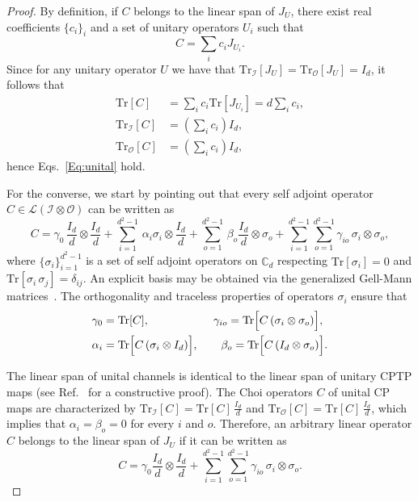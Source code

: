 \documentclass[a4paper,twocolumn,accepted=2022-10-23]{quantumarticle}
\newcommand{\Tr}[0]{{\mathrm{Tr}}}
\theoremstyle{definition}
\begin{document}
\begin{proof}
	By definition, if $C$ belongs to the linear span of $J_U$, there exist real coefficients $\{c_i\}_i$ and a set of unitary operators $U_i$ such that
\begin{equation}
	C=\sum_i c_i J_{U_i}.
\end{equation}
	Since for any unitary operator $U$ we have that $\Tr_{\mathcal{I}}[J_U]=\Tr_{\mathcal{O}}[J_U]= I_d$, it follows that
\begin{align}
	\Tr[C]&=\sum_i c_i \Tr[J_{U_i}]=d \sum_i c_i,  \\
	\Tr_{\mathcal{I}}[C]&= \left(\sum_i c_i \right) I_d, \\
	\Tr_{\mathcal{O}}[C]&= \left(\sum_i c_i \right) I_d,
\end{align}
hence Eqs.~\eqref{Eq:unital} hold.

	For the converse, we start by pointing out that every self adjoint operator $C\in \mathcal{L}(\mathcal{I}\otimes\mathcal{O})$ can be written as
\begin{equation} \label{eq:HSbasis}
	C=\gamma_0 \,\frac{I_d}{d}\otimes \frac{I_d}{d}
	+ \sum_{i=1}^{d^2-1} \,\alpha_i \sigma_i \otimes \frac{I_d}{d}
	+ \sum_{o=1}^{d^2-1 }\, \beta_o  \frac{I_d}{d} \otimes \sigma_o
	+ \sum_{i=1}^{d^2-1}\sum_{o=1}^{d^2-1} \gamma_{io} \,\sigma_i \otimes \sigma_o,
\end{equation}
where $\{\sigma_i\}_{i=1}^{d^2-1}$ is a set of self adjoint operators on $\mathbb{C}_d$ respecting $\Tr[\sigma_i]=0$ and $\Tr[\sigma_i\,\sigma_j]=\delta_{ij}$. An explicit basis may be obtained via the generalized Gell-Mann matrices~\cite{bertlmann08}. The orthogonality and traceless properties of operators $\sigma_i$ ensure that
\begin{align} \label{Eq:HS1}
	\gamma_0 &= \Tr[C],  \hspace*{20mm} \gamma_{io} = \Tr\Big[C\, (\sigma_i\otimes \sigma_o) \Big], \\ \label{Eq:HS2}
	\alpha_i &= \Tr\Big[ C\, (\sigma_i\otimes I_d) \Big], \quad \quad
	\beta_o = \Tr\Big[ C\, (I_d \otimes \sigma_o) \Big].
\end{align}

The linear span of unital channels is identical to the linear span of unitary CPTP maps \cite{mendl09} (see Ref.~\cite{chiribella20} for a constructive proof).
The Choi operators $C$ of unital CP maps are characterized by $\Tr_{\mathcal{I}}[C]= \Tr[C] \, \frac{I_d}{d}$ and $\Tr_{\mathcal{O}}[C] = \Tr[C] \, \frac{I_d}{d}$, which implies that $\alpha_i=\beta_o=0$ for every $i$ and $o$.
Therefore, an arbitrary linear operator $C$ belongs to the linear span of $J_U$ if it can be written as
\begin{equation}
	C=\gamma_0 \frac{I_d}{d}\otimes \frac{I_d}{d}
	+ \sum_{i=1}^{d^2-1}\sum_{o=1}^{d^2-1} \gamma_{io}\, \sigma_i \otimes \sigma_o.
\end{equation}
\end{proof}
\end{document}
